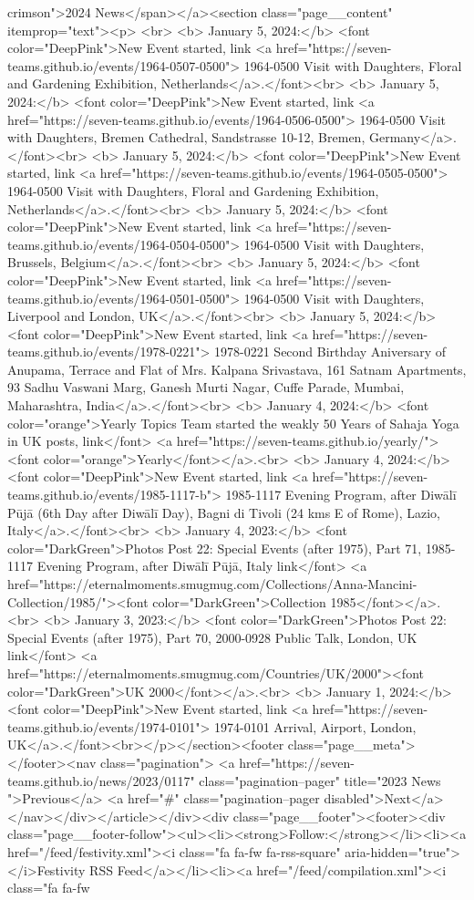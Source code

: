 crimson">2024 News</span></a><section class="page__content" itemprop="text"><p> <br> <b> January 5, 2024:</b> <font color="DeepPink">New Event started, link <a href="https://seven-teams.github.io/events/1964-0507-0500"> 1964-0500 Visit with Daughters, Floral and Gardening Exhibition, Netherlands</a>.</font><br> <b> January 5, 2024:</b> <font color="DeepPink">New Event started, link <a href="https://seven-teams.github.io/events/1964-0506-0500"> 1964-0500 Visit with Daughters, Bremen Cathedral, Sandstrasse 10-12, Bremen, Germany</a>.</font><br> <b> January 5, 2024:</b> <font color="DeepPink">New Event started, link <a href="https://seven-teams.github.io/events/1964-0505-0500"> 1964-0500 Visit with Daughters, Floral and Gardening Exhibition, Netherlands</a>.</font><br> <b> January 5, 2024:</b> <font color="DeepPink">New Event started, link <a href="https://seven-teams.github.io/events/1964-0504-0500"> 1964-0500 Visit with Daughters, Brussels, Belgium</a>.</font><br> <b> January 5, 2024:</b> <font color="DeepPink">New Event started, link <a href="https://seven-teams.github.io/events/1964-0501-0500"> 1964-0500 Visit with Daughters, Liverpool and London, UK</a>.</font><br> <b> January 5, 2024:</b> <font color="DeepPink">New Event started, link <a href="https://seven-teams.github.io/events/1978-0221"> 1978-0221 Second Birthday Aniversary of Anupama, Terrace and Flat of Mrs. Kalpana Srivastava, 161 Satnam Apartments, 93 Sadhu Vaswani Marg, Ganesh Murti Nagar, Cuffe Parade, Mumbai, Maharashtra, India</a>.</font><br> <b> January 4, 2024:</b> <font color="orange">Yearly Topics Team started the weakly 50 Years of Sahaja Yoga in UK posts, link</font> <a href="https://seven-teams.github.io/yearly/"> <font color="orange">Yearly</font></a>.<br> <b> January 4, 2024:</b> <font color="DeepPink">New Event started, link <a href="https://seven-teams.github.io/events/1985-1117-b"> 1985-1117 Evening Program, after Diwālī Pūjā (6th Day after Diwālī Day), Bagni di Tivoli (24 kms E of Rome), Lazio, Italy</a>.</font><br> <b> January 4, 2023:</b> <font color="DarkGreen">Photos Post 22: Special Events (after 1975), Part 71, 1985-1117 Evening Program, after Diwālī Pūjā, Italy link</font> <a href="https://eternalmoments.smugmug.com/Collections/Anna-Mancini-Collection/1985/"><font color="DarkGreen">Collection 1985</font></a>.<br> <b> January 3, 2023:</b> <font color="DarkGreen">Photos Post 22: Special Events (after 1975), Part 70, 2000-0928 Public Talk, London, UK link</font> <a href="https://eternalmoments.smugmug.com/Countries/UK/2000"><font color="DarkGreen">UK 2000</font></a>.<br> <b> January 1, 2024:</b> <font color="DeepPink">New Event started, link <a href="https://seven-teams.github.io/events/1974-0101"> 1974-0101 Arrival, Airport, London, UK</a>.</font><br></p></section><footer class="page__meta"></footer><nav class="pagination"> <a href="https://seven-teams.github.io/news/2023/0117" class="pagination--pager" title="2023 News ">Previous</a> <a href="#" class="pagination--pager disabled">Next</a></nav></div></article></div><div class="page__footer"><footer><div class="page__footer-follow"><ul><li><strong>Follow:</strong></li><li><a href="/feed/festivity.xml"><i class="fa fa-fw fa-rss-square" aria-hidden="true"></i>Festivity RSS Feed</a></li><li><a href="/feed/compilation.xml"><i class="fa fa-fw 